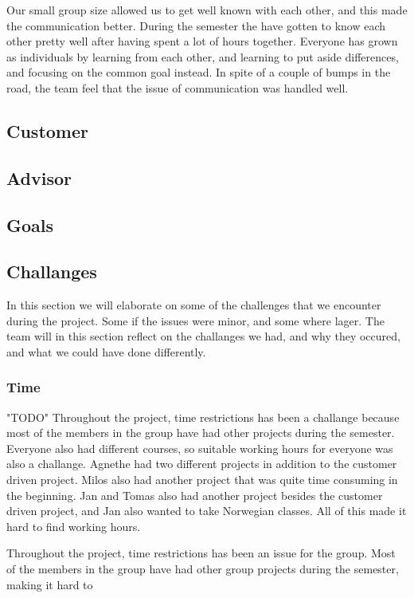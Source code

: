 Our small group size allowed us to get well known with each other, and this made the communication better.
During the semester the have gotten to know each other pretty well after having spent a lot of hours together. Everyone has grown as individuals by learning from each other, and learning to put aside differences, and focusing on the common goal instead.
In spite of a couple of bumps in the road, the team feel that the issue of communication was handled well.

\subsection{Customer} 

\subsection{Advisor}

\subsection{Goals} 

\subsection{Challanges}

In this section we will elaborate on some of the challenges that we encounter during the project. Some if the issues were minor, and some where lager. The team will in this section reflect on the challanges we had, and why they occured, and what we could have done differently.

\subsubsection{Time}
"TODO"
Throughout the project, time restrictions has been a challange because most of the members in the group have had other projects during the semester. Everyone also had different courses, so suitable working hours for everyone was also a challange. Agnethe had two different projects in addition to the customer driven project. Milos also had another project that was quite time consuming in the beginning. Jan and Tomas also had another project besides the customer driven project, and Jan also wanted to take Norwegian classes. All of this made it hard to find working hours. 

Throughout the project, time restrictions has been an issue for the group. Most of the 
members in the group have had other group projects during the semester, making it hard to 
